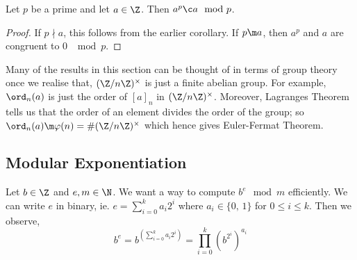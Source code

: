 \begin{nthm}
  Let $p$ be a prime and let $a \in \Z$. Then $a^p \c a \mod p$.
\end{nthm}
\begin{proof}
  If $p \nmid a$, this follows from the earlier corollary. If $p \m a$, then $a^p$ and $a$ are congruent to $0$ $\mod p$.
\end{proof}

\begin{remark}
   Many of the results in this section can be thought of in terms of group theory once we realise that, $(\Z/n\Z)^\times$ is just a finite abelian group. For example, $\ord_n(a)$ is just the order of $[a]_n$ in $(\Z/n\Z)^\times$. Moreover, Lagranges Theorem tells us that the order of an element divides the order of the group; so $\ord_n(a) \m \varphi(n) = \#(\Z/ n\Z)^\times$ which hence gives Euler-Fermat Theorem.
\end{remark}

\subsection{Modular Exponentiation}
Let $b \in \Z$ and $e, m \in \N$. We want a way to compute $b^e \mod m$ efficiently. We can write $e$ in binary, ie. $e = \sum_{i=0}^k a_i2^i$ where $a_i \in \{0,\,1\}$ for $0 \le i \le k$. Then we observe,
$$ b^e = b^{\left( \sum_{i=0}^k a_i2^i \right)} = \prod_{i=0}^k \left( b^{2^i} \right)^{a_i} $$

